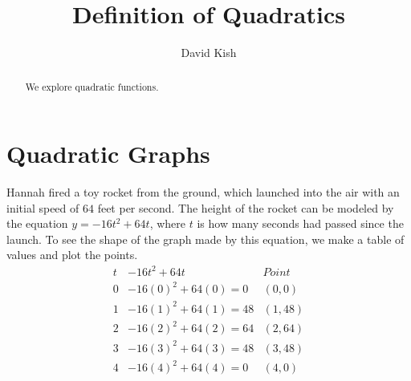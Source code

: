 \documentclass{ximera}
\author{David Kish}
\title{Definition of Quadratics}
\begin{document}
\begin{abstract}
We explore quadratic functions.
\end{abstract}
\maketitle
\section{Quadratic Graphs}
\begin{example}
      Hannah fired a toy rocket from the ground,
      which launched into the air with an initial speed of $64$ feet per second.
      The height of the rocket can be modeled by the equation $y=-16t^2+64t$,
      where $t$ is how many seconds had passed since the launch.
      To see the shape of the graph made by this equation,
      we make a table of values and plot the points.\\
$$
\begin{array}{ccc}
                t & -16t^2+64t & Point\\
\hline
                 0 &  -16(0)^2+64(0) =0 & (0,0) \\
        1& -16(1)^2+64(1) =48&(1,48) \\
          2 & -16(2)^2+64(2) =64 &(2,64)\\
3&-16(3)^2+64(3)=48 &(3,48)\\
            4 & -16(4)^2+64(4)=0  &(4,0)
    \end{array}
$$
\begin{image}
\end{image}
\end{example}
\end{document}
